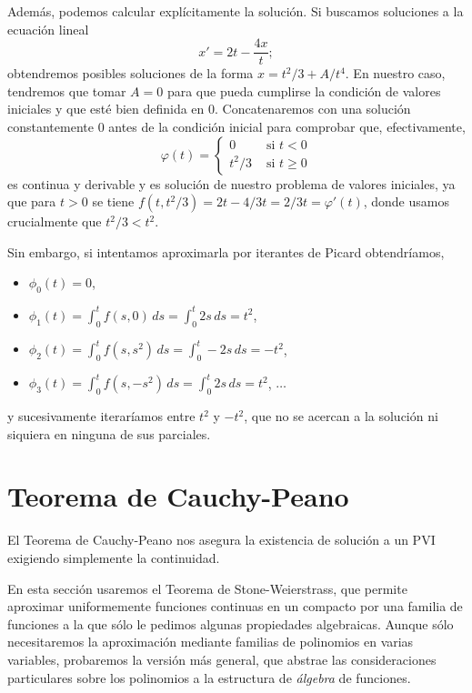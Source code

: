 \documentclass[11pt]{article}
\theoremstyle{plain}
\theoremstyle{definition}
\theoremstyle{remark}
\begin{document}
Además, podemos calcular explícitamente la solución. Si buscamos
soluciones a la ecuación lineal
\[
x' = 2t - \frac{4x}{t};
\]
obtendremos posibles soluciones de la forma $x = t^2/3 + A/t^4$. En
nuestro caso, tendremos que tomar $A = 0$ para que pueda cumplirse
la condición de valores iniciales y que esté bien definida en $0$.
Concatenaremos con una solución constantemente $0$ antes de la
condición inicial para comprobar que, efectivamente,
\[
  \varphi(t) = \left\{\begin{array}{ll}
      0 &\mbox{ si } t < 0 \\
      t^2/3 &\mbox{ si } t \geq 0   
  \end{array}\right.
\]
es continua y derivable y es solución de nuestro problema de
valores iniciales, ya que para $t > 0$ se tiene $f(t,t^2/3) = 2t - 4/3t = 2/3t = \varphi'(t)$,
donde usamos crucialmente que $t^2/3 < t^2$.

Sin embargo, si intentamos aproximarla por iterantes de Picard
obtendríamos,
\begin{itemize}
\item $\phi_0(t) = 0$,
\item $\displaystyle\phi_1(t) = \int_0^t f(s,0)\,ds = \int_0^t 2s\,ds = t^2$,
\item $\displaystyle\phi_2(t) = \int_0^t f(s,s^2)\,ds = \int_0^t -2s\,ds = -t^2$,
\item $\displaystyle\phi_3(t) = \int_0^t f(s,-s^2)\,ds = \int_0^t 2s\,ds = t^2$, $\dots$
\end{itemize}
y sucesivamente iteraríamos entre $t^2$ y $-t^2$, que no se acercan
a la solución ni siquiera en ninguna de sus parciales.


\section{Teorema de Cauchy-Peano}

El Teorema de Cauchy-Peano nos asegura la existencia de solución a
un PVI exigiendo simplemente la continuidad.

En esta sección usaremos el Teorema de Stone-Weierstrass, que permite
aproximar uniformemente funciones continuas en un compacto por una familia
de funciones a la que sólo le pedimos algunas propiedades algebraicas.
Aunque sólo necesitaremos la aproximación mediante familias de polinomios
en varias variables, probaremos la versión más general, que abstrae las
consideraciones particulares sobre los polinomios a la estructura de
\textit{álgebra} de funciones.
\end{document}
